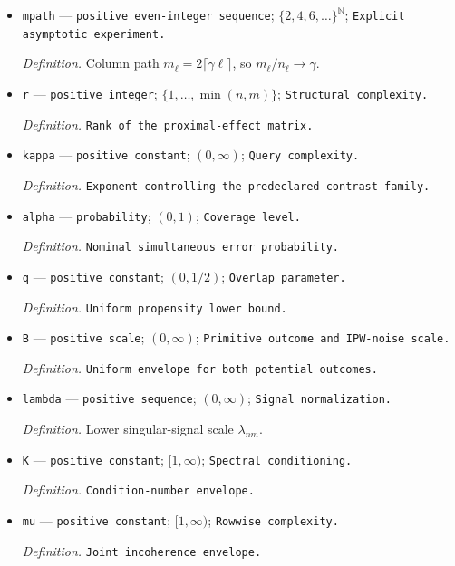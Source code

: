 \documentclass{article}
\begin{document}
\begin{itemize}
  \par\smallskip\noindent\emph{Definition.} Row path \(n_\ell=2\ell\).
  \item \texttt{mpath} --- \texttt{positive even-\allowbreak{}integer sequence}; \(\{2,4,6,\ldots\}^{\mathbb N}\); \texttt{Explicit asymptotic experiment.}
  \par\smallskip\noindent\emph{Definition.} Column path \(m_\ell=2\lceil\gamma\ell\rceil\), so \(m_\ell/n_\ell\to\gamma\).
  \item \texttt{r} --- \texttt{positive integer}; \(\{1,\ldots,\min(n,m)\}\); \texttt{Structural complexity.}
  \par\smallskip\noindent\emph{Definition.} \texttt{Rank of the proximal-\allowbreak{}effect matrix.}
  \item \texttt{kappa} --- \texttt{positive constant}; \((0,\infty)\); \texttt{Query complexity.}
  \par\smallskip\noindent\emph{Definition.} \texttt{Exponent controlling the predeclared contrast family.}
  \item \texttt{alpha} --- \texttt{probability}; \((0,1)\); \texttt{Coverage level.}
  \par\smallskip\noindent\emph{Definition.} \texttt{Nominal simultaneous error probability.}
  \item \texttt{q} --- \texttt{positive constant}; \((0,1/2)\); \texttt{Overlap parameter.}
  \par\smallskip\noindent\emph{Definition.} \texttt{Uniform propensity lower bound.}
  \item \texttt{B} --- \texttt{positive scale}; \((0,\infty)\); \texttt{Primitive outcome and IPW-\allowbreak{}noise scale.}
  \par\smallskip\noindent\emph{Definition.} \texttt{Uniform envelope for both potential outcomes.}
  \item \texttt{lambda} --- \texttt{positive sequence}; \((0,\infty)\); \texttt{Signal normalization.}
  \par\smallskip\noindent\emph{Definition.} Lower singular-signal scale \(\lambda_{nm}\).
  \item \texttt{K} --- \texttt{positive constant}; \([1,\infty)\); \texttt{Spectral conditioning.}
  \par\smallskip\noindent\emph{Definition.} \texttt{Condition-\allowbreak{}number envelope.}
  \item \texttt{mu} --- \texttt{positive constant}; \([1,\infty)\); \texttt{Rowwise complexity.}
  \par\smallskip\noindent\emph{Definition.} \texttt{Joint incoherence envelope.}

\end{itemize}
\end{document}
